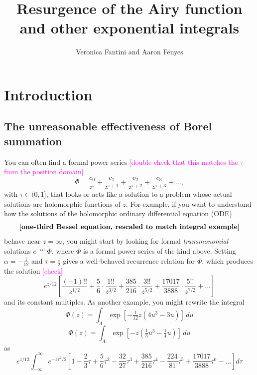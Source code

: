 \documentclass{article}
\title{Resurgence of the Airy function \\ and other exponential integrals}
\author{Veronica Fantini and Aaron Fenyes}
\newcommand{\series}[1]{\tilde{#1}}
\begin{document}
\maketitle
\section{Introduction}
\subsection{The unreasonable effectiveness of Borel summation}\label{intro:summation}
You can often find a formal power series \textcolor{magenta}{[double-check that this matches the $\tau$ from the position domain]}
\[ \series{\Phi} = \frac{c_0}{z^\tau} + \frac{c_1}{z^{\tau+1}} + \frac{c_2}{z^{\tau+2}} + \frac{c_3}{z^{\tau+3}} + \ldots, \]
with $\tau \in (0, 1]$, that looks or acts like a solution to a problem whose actual solutions are holomorphic functions of $z$. For example, if you want to understand how the solutions of the holomorphic ordinary differential equation (ODE)
\begin{equation}
\text{\bf [one-third Bessel equation, rescaled to match integral example]} \label{eqn:bessel-rescaled}
\end{equation}
behave near $z = \infty$, you might start by looking for formal {\em transmonomial} solutions $e^{-\alpha z}\,\series{\Phi}$, where $\series{\Phi}$ is a formal power series of the kind above. Setting $\alpha = -\tfrac{1}{12}$ and $\tau = \tfrac{1}{2}$ gives a well-behaved recurrence relation for $\series{\Phi}$, which produces the solution \textcolor{magenta}{[check]}
\begin{equation}
e^{z/12} \left[ \frac{(-1)!!}{z^{1/2}} + \frac{5}{6} \cdot \frac{1!!}{z^{3/2}} + \frac{385}{216} \cdot \frac{3!!}{z^{5/2}} + \frac{17017}{3888} \cdot \frac{5!!}{z^{7/2}} + \ldots \right] \label{series:bessel-ex}
\end{equation}
and its constant multiples. As another example, you might rewrite the integral
\color{DodgerBlue}
\[ \Phi(z) = \int_{\Lambda} \exp\left[-\tfrac{1}{12} z \left(4u^3 - 3u\right)\right]\,du \]
\color{black}
\[ \Phi(z) = \int_{\Lambda} \exp\left[-z \left(\tfrac{1}{3} u^3 - \tfrac{1}{4} u\right)\right]\,du \]
as
\[ e^{z/12} \int_{-\infty}^\infty e^{-z\tau^2/2} \left[ 1 - \frac{2}{3} \tau + \frac{5}{6} \tau^2 - \frac{32}{27} \tau^3 + \frac{385}{216} \tau^4 - \frac{224}{81} \tau^5 + \frac{17017}{3888} \tau^6 - \ldots \right] d\tau \]
\end{document}
